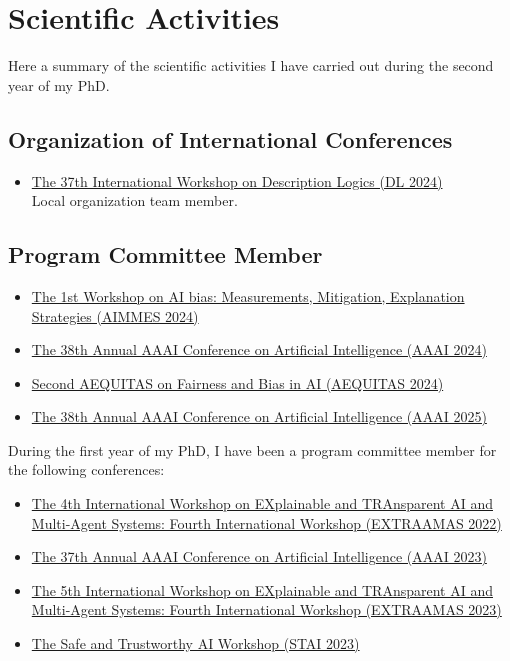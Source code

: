 \documentclass[11pt]{article}
\begin{document}
\section{Scientific Activities}\label{sec:scientific-activities}
%
Here a summary of the scientific activities I have carried out during the second year of my PhD\@.

\subsection{Organization of International Conferences}\label{subsec:organization-of-international-conferences}

\begin{itemize}
	\item \href{https://dl2024.w.uib.no/organization/}{The 37th International Workshop on Description Logics (DL 2024)}
	\\Local organization team member.
\end{itemize}

\subsection{Program Committee Member}\label{subsec:program-committee-member}

\begin{itemize}
	\item \href{https://fairnesscluster.github.io/aimmes23.github.io/index.html}{The 1st Workshop on AI bias: Measurements, Mitigation, Explanation Strategies (AIMMES 2024)}
	\item \href{https://apice.unibo.it/xwiki/bin/view/Event/Aaai2024}{The 38th Annual AAAI Conference on Artificial Intelligence (AAAI 2024)}
	\item \href{https://aequitas-aod.github.io/aequitas-ecai24.github.io/pc-member.html}{Second AEQUITAS on Fairness and Bias in AI (AEQUITAS 2024)}
	\item \href{https://aaai.org/conference/aaai/aaai-25/}{The 38th Annual AAAI Conference on Artificial Intelligence (AAAI 2025)}
\end{itemize}
%
During the first year of my PhD, I have been a program committee member for the following conferences:
%
\begin{itemize}
	\item \href{https://extraamas.ehealth.hevs.ch/archive.html#organizations-2022}{The 4th International Workshop on EXplainable and TRAnsparent AI and Multi-Agent Systems: Fourth International Workshop (EXTRAAMAS 2022)}
	\item \href{https://apice.unibo.it/xwiki/bin/view/Event/Aaai2023}{The 37th Annual AAAI Conference on Artificial Intelligence (AAAI 2023)}
	\item \href{https://apice.unibo.it/xwiki/bin/view/Event/Prima2023}{The 5th International Workshop on EXplainable and TRAnsparent AI and Multi-Agent Systems: Fourth International Workshop (EXTRAAMAS 2023)}
	\item \href{https://web.archive.org/web/20240225110652/https://www.stai.uk/stai-23-iclp}{The Safe and Trustworthy AI Workshop (STAI 2023)}
	\end{itemize}
\end{document}
